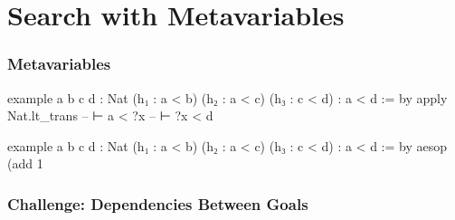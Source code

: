 \documentclass[xetex]{beamer}
\newcommand{\orange}[1]{\textcolor{orange}{#1}}
\newcommand{\mv}[1]{\ensuremath{\mathit{?#1}}}
\begin{document}
\section{Search with Metavariables}

\begin{frame}[fragile]
  \frametitle{Metavariables}

  \begin{leancode}
    example {a b c d : Nat} (h₁ : a < b)
        (h₂ : a < c) (h₃ : c < d) : a < d := by
      apply Nat.lt_trans
      -- ⊢ a < ?x
      -- ⊢ ?x < d

    example {a b c d : Nat} (h₁ : a < b)
        (h₂ : a < c) (h₃ : c < d) : a < d := by
      aesop (add 1%
  \end{leancode}
\end{frame}

\begin{frame}
  \frametitle{Challenge: Dependencies Between Goals}

  \begin{tcolorbox}
    \centering
  \end{tcolorbox}

  \pause

  \begin{tcolorbox}
    \centering
  \end{tcolorbox}
\end{frame}
\end{document}
